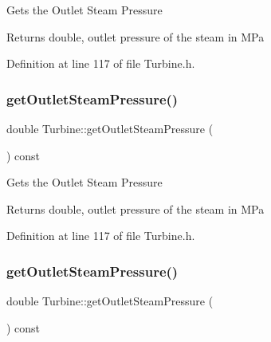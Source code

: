 Gets the Outlet Steam Pressure

\begin{DoxyReturn}{Returns}
double, outlet pressure of the steam in M\+Pa 
\end{DoxyReturn}


Definition at line 117 of file Turbine.\+h.

\mbox{\label{class_turbine_a1589b2364a553db7aaa875bb543d171d}} 
\subsubsection{\texorpdfstring{get\+Outlet\+Steam\+Pressure()}{getOutletSteamPressure()}\hspace{0.1cm}{\footnotesize\ttfamily [2/3]}}
{\footnotesize\ttfamily double Turbine\+::get\+Outlet\+Steam\+Pressure (\begin{DoxyParamCaption}{ }\end{DoxyParamCaption}) const\hspace{0.3cm}{\ttfamily [inline]}}

Gets the Outlet Steam Pressure

\begin{DoxyReturn}{Returns}
double, outlet pressure of the steam in M\+Pa 
\end{DoxyReturn}


Definition at line 117 of file Turbine.\+h.

\mbox{\label{class_turbine_a1589b2364a553db7aaa875bb543d171d}} 
\subsubsection{\texorpdfstring{get\+Outlet\+Steam\+Pressure()}{getOutletSteamPressure()}\hspace{0.1cm}{\footnotesize\ttfamily [3/3]}}
{\footnotesize\ttfamily double Turbine\+::get\+Outlet\+Steam\+Pressure (\begin{DoxyParamCaption}{ }\end{DoxyParamCaption}) const\hspace{0.3cm}{\ttfamily [inline]}}

